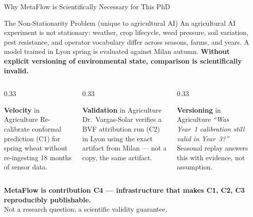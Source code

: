 \documentclass[10pt,aspectratio=169]{beamer}
\newcommand{\V}[1]{\textcolor{mforange}{\textbf{V#1}}}
\begin{document}
\begin{frame}{Why MetaFlow is Scientifically Necessary for This PhD}

\begin{alertblock}{The Non-Stationarity Problem (unique to agricultural AI)}
\small An agricultural AI experiment is not stationary: weather, crop lifecycle, weed pressure, soil variation, pest resistance, and operator vocabulary differ across seasons, farms, and years. A model trained in Lyon spring is evaluated against Milan autumn. \textbf{Without explicit versioning of environmental state, comparison is scientifically invalid.}
\end{alertblock}

\vspace{0.3cm}
\begin{columns}
\begin{column}{0.33\textwidth}
\begin{block}{\V{elocity} in Agriculture}
\small Re-calibrate conformal prediction (C1) for spring wheat without re-ingesting 18 months of sensor data.
\end{block}
\end{column}
\begin{column}{0.33\textwidth}
\begin{block}{\V{alidation} in Agriculture}
\small Dr.\ Vargas-Solar verifies a BVF attribution run (C2) in Lyon using the exact artifact from Milan --- not a copy, the same artifact.
\end{block}
\end{column}
\begin{column}{0.33\textwidth}
\begin{block}{\V{ersioning} in Agriculture}
\small \emph{``Was Year~1 calibration still valid in Year~3?''} Seasonal replay answers this with evidence, not assumption.
\end{block}
\end{column}
\end{columns}

\vspace{0.4cm}
\begin{center}
\small\textbf{MetaFlow is contribution C4 --- infrastructure that makes C1, C2, C3 reproducibly publishable.}\\
Not a research question; a scientific validity guarantee.
\end{center}

\end{frame}
\end{document}
